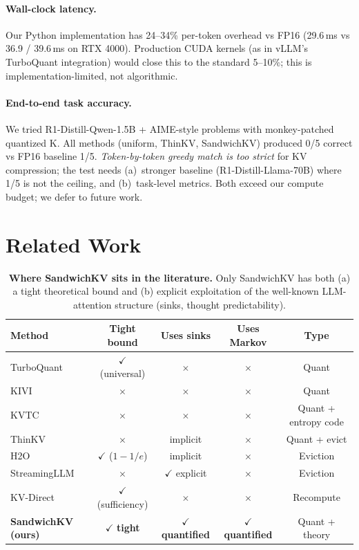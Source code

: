 \documentclass[11pt]{article}
\theoremstyle{definition}
\begin{document}
\paragraph{Wall-clock latency.} Our Python implementation has 24--34\% per-token overhead vs FP16 (29.6\,ms vs 36.9 / 39.6\,ms on RTX 4000). Production CUDA kernels (as in vLLM's TurboQuant integration) would close this to the standard 5--10\%; this is implementation-limited, not algorithmic.

\paragraph{End-to-end task accuracy.} We tried R1-Distill-Qwen-1.5B + AIME-style problems with monkey-patched quantized K. All methods (uniform, ThinKV, SandwichKV) produced 0/5 correct vs FP16 baseline 1/5. \emph{Token-by-token greedy match is too strict} for KV compression; the test needs (a)~stronger baseline (R1-Distill-Llama-70B) where 1/5 is not the ceiling, and (b)~task-level metrics. Both exceed our compute budget; we defer to future work.

\section{Related Work}
\label{sec:related}

\begin{table}[t]
\centering
\caption{\textbf{Where SandwichKV sits in the literature.} Only SandwichKV has both (a) a tight theoretical bound and (b) explicit exploitation of the well-known LLM-attention structure (sinks, thought predictability).}
\label{tab:related}
\begin{tabular}{lcccc}
\toprule
\textbf{Method} & Tight bound & Uses sinks & Uses Markov & Type \\
\midrule
TurboQuant \citep{turboquant} & $\checkmark$ (universal) & $\times$ & $\times$ & Quant \\
KIVI \citep{kivi} & $\times$ & $\times$ & $\times$ & Quant \\
KVTC \citep{kvtc} & $\times$ & $\times$ & $\times$ & Quant + entropy code \\
ThinKV \citep{thinkv} & $\times$ & implicit & $\times$ & Quant + evict \\
H2O \citep{h2o} & $\checkmark$ ($1{-}1/e$) & implicit & $\times$ & Eviction \\
StreamingLLM \citep{streamingllm} & $\times$ & $\checkmark$ explicit & $\times$ & Eviction \\
KV-Direct \citep{kv-direct} & $\checkmark$ (sufficiency) & $\times$ & $\times$ & Recompute \\
\midrule
\textbf{SandwichKV (ours)} & $\boldsymbol{\checkmark}$ \textbf{tight} & $\boldsymbol{\checkmark}$ \textbf{quantified} & $\boldsymbol{\checkmark}$ \textbf{quantified} & Quant + theory \\
\bottomrule
\end{tabular}
\end{table}
\end{document}
